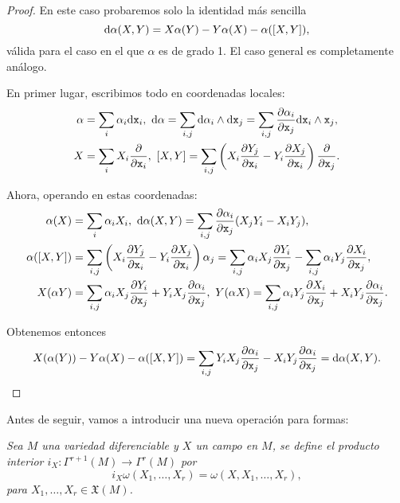 \begin{proof}
En este caso probaremos solo la identidad más sencilla 
\begin{equation*}
  \mathrm{d} \alpha (X,Y) = X\alpha(Y) - Y \alpha(X) - \alpha(\left[X,Y\right]),
\end{equation*}
válida para el caso en el que $\alpha$ es de grado 1. El caso general es completamente análogo.

En primer lugar, escribimos todo en coordenadas locales:
\begin{align*}
  \alpha &= \sum_i \alpha_i \dd \xx _i, \ \dd \alpha = \sum_{i,j} \dd \alpha_i \wedge \dd \xx _j = \sum_{i,j}\parcial{\alpha_i}{\xx_j} \dd \xx_i \wedge \xx_j, \\
  X &= \sum_i X_i \deriv{\xx_i}, \ 
  \lie{X}{Y} = \sum_{i,j} \left( X_i \parcial{Y_j}{\xx_i} - Y_i \parcial{X_j}{\xx_i} \right) \deriv{\xx_j}.
\end{align*}

Ahora, operando en estas coordenadas:
\begin{align*}
  \alpha(X) &= \sum_i \alpha_i X_i, \ 
  \dd \alpha (X,Y) = \sum_{i,j} \parcial{\alpha_i}{\xx_j} (X_jY_i-X_iY_j), \\
  \alpha(\lie{X}{Y}) &= \sum_{i,j} \left( X_i \parcial{Y_j}{\xx_i} - Y_i \parcial{X_j}{\xx_i} \right) \alpha_j = \sum_{i,j} \alpha_i X_j \parcial{Y_i}{\xx_j} - \sum_{i,j}\alpha_i Y_j \parcial{X_i}{\xx_j}, \\
  X(\alpha Y) &= \sum_{i,j}\alpha_i X_j \parcial{Y_i}{\xx_j} + Y_i X_j \parcial{\alpha_i}{\xx_j}, \ 
Y(\alpha X) = \sum_{i,j}\alpha_i Y_j \parcial{X_i}{\xx_j} + X_i Y_j \parcial{\alpha_i}{\xx_j}.
\end{align*}

Obtenemos entonces
\begin{equation*}
  X(\alpha(Y))-Y\alpha(X)-\alpha(\left[X,Y\right]) = \sum_{i,j} Y_iX_j \frac{\partial \alpha_i}{\partial \mathtt{x}_j} - X_iY_j \frac{\partial \alpha_i}{\partial \mathtt{x}_j} = \mathrm{d} \alpha (X,Y).
\end{equation*}
\end{proof}

Antes de seguir, vamos a introducir una nueva operación para formas:
\begin{defn}
  \em
  Sea $M$ una variedad diferenciable y $X$ un campo en $M$, se define el \emph{producto interior} $i_X:\Gamma^{r+1}(M)\rightarrow \Gamma^r(M)$ por 
  \begin{equation*}
    i_X \omega(X_1,\dots,X_r)=\omega(X,X_1,\dots,X_r),
  \end{equation*}
  para $X_1,\dots,X_r \in \mathfrak{X}(M)$.
\end{defn}

